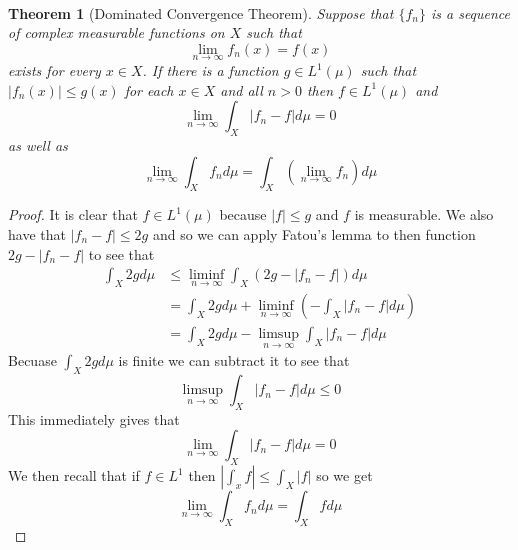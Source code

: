 \documentclass{article}
\newtheorem*{thm}{\\ Theorem}
\begin{document}
\begin{thm}[Dominated Convergence Theorem]
  Suppose that $\{f_n\}$ is a sequence of complex measurable functions on $X$
  such that
  \[
   \lim_{n\to\infty} f_n(x) = f(x)
  \]
  exists for every $x \in X$. If there is a function $g \in L^1(\mu)$ such
  that $|f_n(x)| \leq g(x)$ for each $x \in X$ and all $n > 0$ then $f \in
  L^1(\mu)$ and
  \[
  \lim_{n\to\infty} \int_X |f_n - f| d\mu = 0
  \]
  as well as
  \[
  \lim_{n\to\infty} \int_X f_n d\mu = \int_X (\lim_{n\to \infty} f_n) d\mu
  \]
\end{thm}
\begin{proof}
  It is clear that $f \in L^1(\mu)$ because $|f| \leq g$ and $f$ is
  measurable. We also have that $|f_n - f| \leq 2g$ and so we can apply
  Fatou's lemma to then function $2g - |f_n - f|$ to see that
  \begin{align*}
    \int_X 2g d\mu &\leq \liminf_{n\to\infty}\int_X (2g - |f_n - f|) d\mu \\
    &= \int_X 2g d\mu + \liminf_{n\to\infty}\left(-\int_X|f_n - f| d\mu\right)
    \\ &= \int_X 2g d\mu - \limsup_{n\to\infty}\int_X |f_n - f|d\mu
  \end{align*}
  Becuase $\int_X 2gd\mu$ is finite we can subtract it to see that
  \[
  \limsup_{n\to\infty} \int_X |f_n - f|d\mu \leq 0
  \]
  This immediately gives that
  \[
  \lim_{n\to\infty}\int_X |f_n -f| d\mu = 0
  \]
  We then recall that if $f \in L^1$ then $|\int_x f| \leq \int_X|f|$ so we
  get
  \[
  \lim_{n\to\infty} \int_X f_n d\mu = \int_X fd\mu
  \]
\end{proof}
\end{document}
